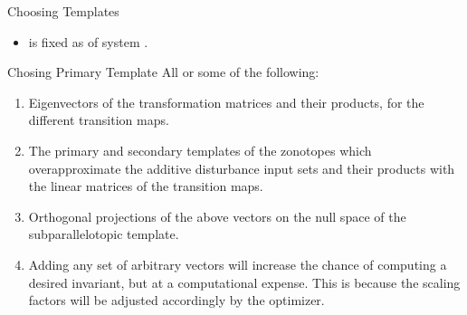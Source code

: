 \begin{frame}{Choosing Templates}
\begin{itemize}
\item {} is fixed as  of system .\pause
\end{itemize}
\begin{block}{Chosing Primary Template}
All or some of the following:\pause
\begin{enumerate}
\item Eigenvectors of the transformation matrices and their products, for
   the different transition maps.  \pause  
\item  The primary and
   secondary templates of the zonotopes which overapproximate the
   additive disturbance input sets and their products with the linear
   matrices of the transition maps.  \pause
\item
   Orthogonal projections of the above vectors on the null space of
   the subparallelotopic template.  \pause
\item Adding any set of arbitrary vectors will increase the
   chance of computing a desired invariant, but at a computational
   expense.  This is because the scaling factors will be adjusted
   accordingly by the optimizer.
\end{enumerate}
\end{block}
\end{frame}

